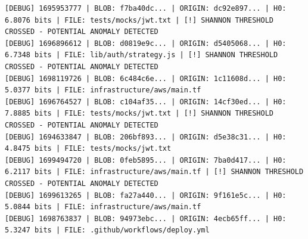 \documentclass[12pt, a4paper, oneside]{report}
\begin{document}
\begin{lstlisting}[basicstyle=\tiny\ttfamily]
[DEBUG] 1695953777 | BLOB: f7ba40dc... | ORIGIN: dc92e897... | H0: 6.8076 bits | FILE: tests/mocks/jwt.txt | [!] SHANNON THRESHOLD CROSSED - POTENTIAL ANOMALY DETECTED
[DEBUG] 1696896612 | BLOB: d0819e9c... | ORIGIN: d5405068... | H0: 6.7348 bits | FILE: lib/auth/strategy.js | [!] SHANNON THRESHOLD CROSSED - POTENTIAL ANOMALY DETECTED
[DEBUG] 1698119726 | BLOB: 6c484c6e... | ORIGIN: 1c11608d... | H0: 5.0377 bits | FILE: infrastructure/aws/main.tf
[DEBUG] 1696764527 | BLOB: c104af35... | ORIGIN: 14cf30ed... | H0: 7.8885 bits | FILE: tests/mocks/jwt.txt | [!] SHANNON THRESHOLD CROSSED - POTENTIAL ANOMALY DETECTED
[DEBUG] 1694633847 | BLOB: 206bf893... | ORIGIN: d5e38c31... | H0: 4.8475 bits | FILE: tests/mocks/jwt.txt
[DEBUG] 1699494720 | BLOB: 0feb5895... | ORIGIN: 7ba0d417... | H0: 6.2117 bits | FILE: infrastructure/aws/main.tf | [!] SHANNON THRESHOLD CROSSED - POTENTIAL ANOMALY DETECTED
[DEBUG] 1699613265 | BLOB: fa27a440... | ORIGIN: 9f161e5c... | H0: 5.0844 bits | FILE: infrastructure/aws/main.tf
[DEBUG] 1698763837 | BLOB: 94973ebc... | ORIGIN: 4ecb65ff... | H0: 5.3247 bits | FILE: .github/workflows/deploy.yml
\end{lstlisting}
\end{document}
